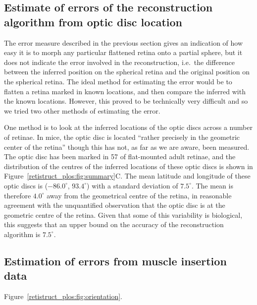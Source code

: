 \documentclass[10pt]{article}
\begin{document}
\subsection*{Estimate of errors of the reconstruction algorithm from
  optic disc location}

The error measure described in the previous section gives an
indication of how easy it is to morph any particular flattened retina
onto a partial sphere, but it does not indicate the error involved in
the reconstruction, i.e.\ the difference between the inferred
position on the spherical retina and the original position on the
spherical retina. The ideal method for estimating the error would be
to flatten a retina marked in known locations, and then compare the
inferred with the known locations. However, this proved to be
technically very difficult and so we tried two other methods of
estimating the error.

One method is to look at the inferred locations of the optic discs
across a number of retinae. In mice, the optic disc is located
``rather precisely in the geometric center of the retina''
\cite{DragOlse81gang} though this has not, as far as we are aware,
been measured. The optic disc has been marked in 57 of flat-mounted
adult retinae, and the distribution of the centres of the inferred
locations of these optic discs is shown in
Figure~\ref{retistruct_plos:fig:summary}C. The mean latitude and
longitude of these optic discs is ($-86.0^\circ$, $93.4^\circ$) with a
standard deviation of $7.5^\circ$. The mean is therefore $4.0^\circ$
away from the geometrical centre of the retina, in reasonable
agreement with the unquantified observation that the optic disc is at
the geometric centre of the retina.  Given that some of this
variability is biological, this suggests that an upper bound on the
accuracy of the reconstruction algorithm is $7.5^\circ$.

\subsection*{Estimation of errors from muscle insertion data}

Figure~\ref{retistruct_plos:fig:orientation}.




\end{document}
